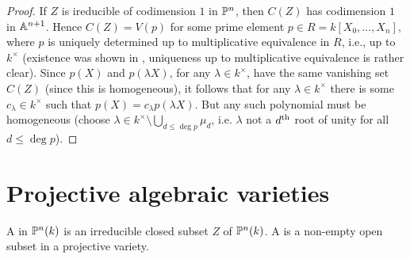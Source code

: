\documentclass[a4paper,parskip=half,numbers=enddot, DIV=12]{scrreprt}
\begin{document}
\begin{proof}
If $Z$ is ireducible of codimension $1$ in $\mathbb{P}^n$, then $C(Z)$ has codimension $1$ in $\mathbb{A}^{n+1}$. Hence $C(Z) = V(p)$ for some prime element
$p\in R = k[X_0,\ldots,X_n]$, where $p$ is uniquely determined up to multiplicative equivalence in $R$, i.e., up to $k^\times$
(existence was shown in \cite[Proposition~2.1.3]{alg1}, uniqueness up to multiplicative equivalence is rather clear). 
Since $p(X)$ and $p(\lambda X)$, for any $\lambda\in k^\times$, have the same vanishing set $C(Z)$ (since this is homogeneous), it follows that for any $\lambda\in k^\times$ there is some $c_\lambda\in k^\times$ such that $p(X) = c_\lambda p(\lambda X)$. But any such polynomial must be homogeneous (choose $\lambda\in k^\times \setminus\bigcup_{d\leq\deg p} \mu_d$,
i.e. $\lambda$ not a $d^{\text{th}}$ root of unity for all $d\leq\deg p$).
\end{proof}

\section{Projective algebraic varieties}

\begin{defi}
    A  in $\mathbb{P}^n(k)$ is an irreducible closed subset $Z$ of $\mathbb{P}^n(k)$. A  is a non-empty open subset in a projective variety.
\end{defi}
\end{document}
